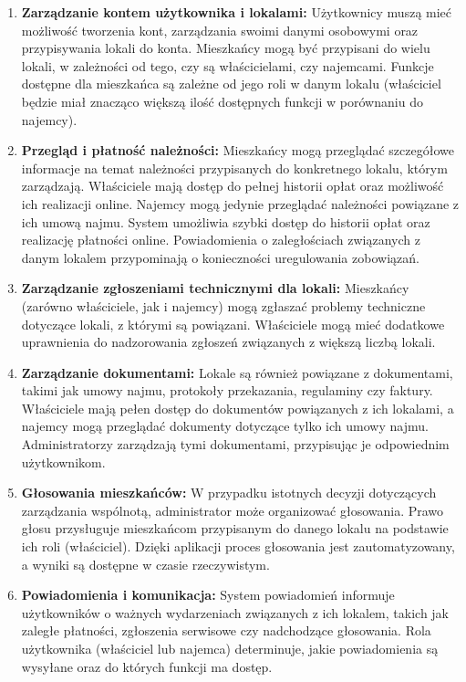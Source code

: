 \begin{enumerate}[label=\arabic*.]

	\item \textbf{Zarządzanie kontem użytkownika i lokalami:} Użytkownicy muszą mieć możliwość tworzenia kont, zarządzania swoimi danymi osobowymi oraz przypisywania lokali do konta. Mieszkańcy mogą być przypisani do wielu lokali, w zależności od tego, czy są właścicielami, czy najemcami. Funkcje dostępne dla mieszkańca są zależne od jego roli w danym lokalu (właściciel będzie miał znacząco większą ilość dostępnych funkcji w porównaniu do najemcy).

	\item \textbf{Przegląd i płatność należności:} Mieszkańcy mogą przeglądać szczegółowe informacje na temat należności przypisanych do konkretnego lokalu, którym zarządzają. Właściciele mają dostęp do pełnej historii opłat oraz możliwość ich realizacji online. Najemcy mogą jedynie przeglądać należności powiązane z ich umową najmu. System umożliwia szybki dostęp do historii opłat oraz realizację płatności online. Powiadomienia o zaległościach związanych z danym lokalem przypominają o konieczności uregulowania zobowiązań.

	\item \textbf{Zarządzanie zgłoszeniami technicznymi dla lokali:} Mieszkańcy (zarówno właściciele, jak i najemcy) mogą zgłaszać problemy techniczne dotyczące lokali, z którymi są powiązani. Właściciele mogą mieć dodatkowe uprawnienia do nadzorowania zgłoszeń związanych z większą liczbą lokali.

	\item \textbf{Zarządzanie dokumentami:} Lokale są również powiązane z dokumentami, takimi jak umowy najmu, protokoły przekazania, regulaminy czy faktury. Właściciele mają pełen dostęp do dokumentów powiązanych z ich lokalami, a najemcy mogą przeglądać dokumenty dotyczące tylko ich umowy najmu. Administratorzy zarządzają tymi dokumentami, przypisując je odpowiednim użytkownikom.

	\item \textbf{Głosowania mieszkańców:} W przypadku istotnych decyzji dotyczących zarządzania wspólnotą, administrator może organizować głosowania. Prawo głosu przysługuje mieszkańcom przypisanym do danego lokalu na podstawie ich roli (właściciel). Dzięki aplikacji proces głosowania jest zautomatyzowany, a wyniki są dostępne w czasie rzeczywistym.

	\item \textbf{Powiadomienia i komunikacja:} System powiadomień informuje użytkowników o ważnych wydarzeniach związanych z ich lokalem, takich jak zaległe płatności, zgłoszenia serwisowe czy nadchodzące głosowania. Rola użytkownika (właściciel lub najemca) determinuje, jakie powiadomienia są wysyłane oraz do których funkcji ma dostęp.


\end{enumerate}
